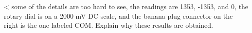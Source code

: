 <%
some of the details are too hard to see, the readings are 1353, -1353, and 0, the rotary
dial is on a 2000 mV DC scale, and the banana plug connector on the right is the one
labeled COM.
Explain why these results are obtained.

